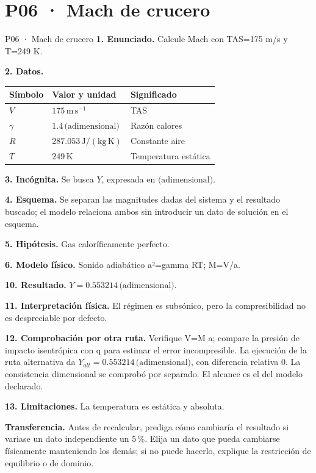 \chapter*{P06 · Mach de crucero}
\begin{studiumworked}{P06 · Mach de crucero}
\textbf{1. Enunciado.} Calcule Mach con TAS=175 m/s y T=249 K.

\textbf{2. Datos.}
\begin{longtable}{p{.16\linewidth}p{.35\linewidth}p{.38\linewidth}}\toprule Símbolo & Valor y unidad & Significado\\\midrule\endhead
$V$ & $175\,\mathrm{m\,s^{-1}}$ & TAS\\
$\gamma$ & $1.4\,\text{(adimensional)}$ & Razón calores\\
$R$ & $287.053\,\mathrm{J/(kg\,K)}$ & Constante aire\\
$T$ & $249\,\mathrm K$ & Temperatura estática\\
\bottomrule\end{longtable}
\textbf{3. Incógnita.} Se busca $Y$, expresada en $\text{(adimensional)}$.

\textbf{4. Esquema.} Se separan las magnitudes dadas del sistema y el resultado buscado; el modelo relaciona ambos sin introducir un dato de solución en el esquema.

\textbf{5. Hipótesis.} Gas caloríficamente perfecto.

\textbf{6. Modelo físico.} Sonido adiabático a²=gamma RT; M=V/a.


\textbf{10. Resultado.} $Y=0.553214\,\text{(adimensional)}$.

\textbf{11. Interpretación física.} El régimen es subsónico, pero la compresibilidad no es despreciable por defecto.

\textbf{12. Comprobación por otra ruta.} Verifique V=M a; compare la presión de impacto isentrópica con q para estimar el error incompresible. La ejecución de la ruta alternativa da $Y_{alt}=0.553214\,\text{(adimensional)}$, con diferencia relativa $0$. La consistencia dimensional se comprobó por separado. El alcance es el del modelo declarado.

\textbf{13. Limitaciones.} La temperatura es estática y absoluta.

\textbf{Transferencia.} Antes de recalcular, prediga cómo cambiaría el resultado si variase un dato independiente un 5\,\%. Elija un dato que pueda cambiarse físicamente manteniendo los demás; si no puede hacerlo, explique la restricción de equilibrio o de dominio.\par
\end{studiumworked}
